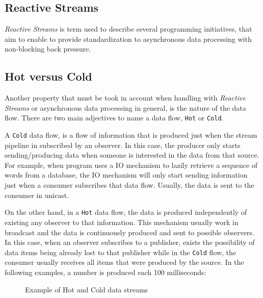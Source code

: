 	\subsection{Reactive Streams} 
	\textit{Reactive Streams} is term used to describe several programming initiatives, that aim to enable to provide standardization to asynchronous data processing with non-blocking back pressure. 


	\subsection{Hot versus Cold}
	
	Another property that must be took in account when handling with \textit{Reactive Streams} or asynchronous data processing in general, is the nature of the data flow. 
	There are two main adjectives to name a data flow, \texttt{Hot} or \texttt{Cold}. 

	A \texttt{Cold} data flow, is a flow of information that is produced just when the stream pipeline in subscribed by an observer. In this case, the producer only starts sending/producing data when someone is interested in the data from that source. 
	For example, when program uses a IO mechanism to lazily retrieve a sequence of words from a database, the IO mechanism will only start sending information just when a consumer subscribes that data flow. Usually, the data is sent to the consumer in unicast.
	
	On the other hand, in a \texttt{Hot} data flow, the data is produced independently of existing any observer to that information. This mechanism usually work in broadcast and the data is continuously produced and sent to possible observers.
	In this case, when an observer subscribes to a publisher, exists the possibility of data items being already lost to that publisher while in the \texttt{Cold} flow, the consumer usually receives all items that were produced by the source.
	In the following examples, a number is produced each 100 milliseconds:

	\begin{figure}[H]
		\centering
		\begin{subfigure}[h]{1.2\textwidth}
			\centering
		 \end{subfigure}	
	\qquad\qquad
		 \begin{subfigure}[h]{1.2\textwidth}
			\centering
		\end{subfigure}		
	  \caption{Example of Hot and Cold data streams}
	  \label{fig:exmplo3}
	\end{figure}

